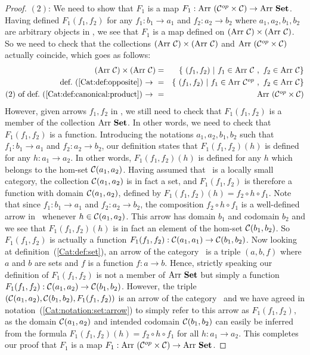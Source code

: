\begin{proof}
    $(2)$: We need to show that $F_{1}$ is a map $F_{1}:\mbox{\rm Arr}\ (\mbox{${\cal C}^{op}$}\times\mbox{$\cal C$})
    \to\mbox{\rm Arr}\ \mbox{\bf Set}$. Having defined $F_{1}(f_{1},f_{2})$ for any $f_{1}:b_{1}\to
    a_{1}$ and $f_{2}:a_{2}\to b_{2}$ where $a_{1},a_{2},b_{1},b_{2}$ are 
    arbitrary objects in \Cat, we see that $F_{1}$ is a map defined 
    on $(\arr\ \Cat)\times(\arr\ \Cat)$. So we need to check that the collections
    $(\arr\ \Cat)\times(\arr\ \Cat)$ and $\mbox{\rm Arr}\ (\mbox{${\cal C}^{op}$}\times\mbox{$\cal C$})$ actually
    coincide, which goes as follows:
        \begin{eqnarray*}(\arr\ \Cat)\times(\arr\ \Cat)
            &=&\{\ (f_{1},f_{2})\ |\ f_{1}\in\arr\ \Cat\ ,\ f_{2}\in\arr\ \Cat\}\\
            \mbox{def.~(\ref{Cat:def:opposite})\ $\to$\ }
            &=&\{\ (f_{1},f_{2})\ |\ f_{1}\in\arr\ \Cop\ ,\ f_{2}\in\arr\ \Cat\}\\
            \mbox{$(2)$ of def.~(\ref{Cat:def:canonical:product})\ $\to$\ }
            &=&\arr\ (\Cop\times\Cat)
        \end{eqnarray*}
    However, given arrows $f_{1}, f_{2}$ in \Cat, we still need to check that
    $F_{1}(f_{1},f_{2})$ is a member of the collection $\arr\ \Set$. In other
    words, we need to check that $F_{1}(f_{1},f_{2})$ is a function. Introducing
    the notations $a_{1},a_{2},b_{1},b_{2}$ such that $f_{1}:b_{1}\to a_{1}$ and
    $f_{2}:a_{2}\to b_{2}$, our definition states that $F_{1}(f_{1},f_{2})(h)$ is
    defined for any $h:a_{1}\to a_{2}$. In other words, $F_{1}(f_{1},f_{2})(h)$
    is defined for any $h$ which belongs to the hom-set $\mbox{$\cal C$}(a_{1},a_{2})$.
    Having assumed that \Cat\ is a locally small category, the collection
    $\mbox{$\cal C$}(a_{1},a_{2})$ is in fact a set, and $F_{1}(f_{1},f_{2})$ is
    therefore a function with domain $\mbox{$\cal C$}(a_{1},a_{2})$, defined by
    $F_{1}(f_{1},f_{2})(h)=f_{2}\circ h\circ f_{1}$. Note that since
    $f_{1}:b_{1}\to a_{1}$ and $f_{2}:a_{2}\to b_{2}$, the composition
    $f_{2}\circ h\circ f_{1}$ is a well-defined arrow in \Cat\ whenever 
    $h\in\mbox{$\cal C$}(a_{1},a_{2})$. This arrow has domain $b_{1}$ and codomain 
    $b_{2}$ and we see that $F_{1}(f_{1},f_{2})(h)$ is in fact an element
    of the hom-set $\mbox{$\cal C$}(b_{1},b_{2})$. So $F_{1}(f_{1},f_{2})$ is actually
    a function $F_{1}(f_{1},f_{2}):\mbox{$\cal C$}(a_{1},a_{1})\to\mbox{$\cal C$}(b_{1},b_{2})$.
    Now looking at definition~(\ref{Cat:def:set}), an arrow of the category
    \Set\ is a triple $(a,b,f)$ where $a$ and $b$ are sets and $f$ is a
    function $f:a\to b$. Hence, strictly speaking our definition of 
    $F_{1}(f_{1},f_{2})$ is not a member of $\arr\ \Set$ but simply a 
    function $F_{1}(f_{1},f_{2}): \mbox{$\cal C$}(a_{1},a_{2})\to\mbox{$\cal C$}(b_{1},b_{2})$. 
    However, the triple 
    $(\mbox{$\cal C$}(a_{1},a_{2}),\mbox{$\cal C$}(b_{1},b_{2}),F_{1}(f_{1},f_{2}))$ is an arrow
    of the category \Set\ and we have agreed in 
    notation~(\ref{Cat:notation:set:arrow}) to simply refer to this arrow as
    $F_{1}(f_{1},f_{2})$, as the domain $\mbox{$\cal C$}(a_{1},a_{2})$ and intended
    codomain $\mbox{$\cal C$}(b_{1},b_{2})$ can easily be inferred from the formula
    $F_{1}(f_{1},f_{2})(h) = f_{2}\circ h\circ f_{1}$ for all $h:a_{1}\to 
    a_{2}$. This completes our proof that $F_{1}$ is a map $F_{1}:
    \mbox{\rm Arr}\ (\mbox{${\cal C}^{op}$}\times\mbox{$\cal C$})\to\mbox{\rm Arr}\ \mbox{\bf Set}$.


\end{proof}
